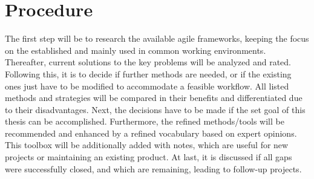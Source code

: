 \section*{Procedure}

The first step will be to research the available agile frameworks, keeping the focus on the established and mainly used in common working environments. Thereafter, current solutions to the key problems will be analyzed and rated. Following this, it is to decide if further methods are needed, or if the existing ones just have to be modified to accommodate a feasible workflow. All listed methods and strategies will be compared in their benefits and differentiated due to their disadvantages. Next, the decisions have to be made if the set goal of this thesis can be accomplished. Furthermore, the refined methods/tools will be recommended and enhanced by a refined vocabulary based on expert opinions. This toolbox will be additionally added with notes, which are useful for new projects or maintaining an existing product. At last, it is discussed if all gaps were successfully closed, and which are remaining, leading to follow-up projects.